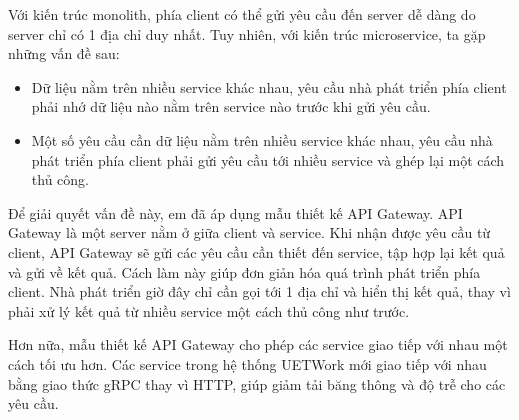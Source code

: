 \documentclass[./../main.tex]{subfiles}
\begin{document}
Với kiến trúc monolith, phía client có thể gửi yêu cầu đến server dễ
dàng do server chỉ có 1 địa chỉ duy nhất. Tuy nhiên, với kiến trúc
microservice, ta gặp những vấn đề sau:

\begin{itemize}
\item
  
  Dữ liệu nằm trên nhiều service khác nhau, yêu cầu nhà phát triển phía
  client phải nhớ dữ liệu nào nằm trên service nào trước khi gửi yêu
  cầu.
  
\item
  
  Một số yêu cầu cần dữ liệu nằm trên nhiều service khác nhau, yêu cầu
  nhà phát triển phía client phải gửi yêu cầu tới nhiều service và ghép
  lại một cách thủ công.
  
\end{itemize}

Để giải quyết vấn đề này, em đã áp dụng mẫu thiết kế API Gateway. API
Gateway là một server nằm ở giữa client và service. Khi nhận được yêu
cầu từ client, API Gateway sẽ gửi các yêu cầu cần thiết đến service, tập
hợp lại kết quả và gửi về kết quả. Cách làm này giúp đơn giản hóa quá
trình phát triển phía client. Nhà phát triển giờ đây chỉ cần gọi tới 1
địa chỉ và hiển thị kết quả, thay vì phải xử lý kết quả từ nhiều service
một cách thủ công như trước.

Hơn nữa, mẫu thiết kế API Gateway cho phép các service giao tiếp với
nhau một cách tối ưu hơn. Các service trong hệ thống UETWork mới giao
tiếp với nhau bằng giao thức gRPC thay vì HTTP, giúp giảm tải băng thông
và độ trễ cho các yêu cầu.
\end{document}
